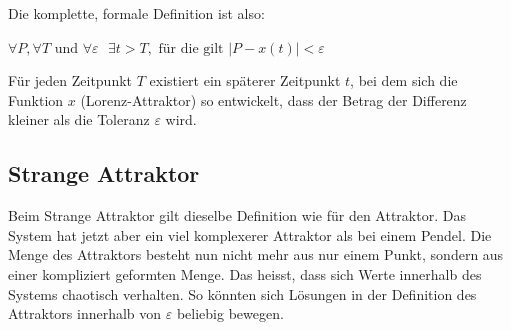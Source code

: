 Die komplette, formale Definition ist also:

\begin{center}\label{Attraktor}
$\forall P, \forall T \text{ und } \forall \varepsilon \text{ } \exists t > T , \text{ für die gilt } |P - x(t) |< \varepsilon$
\end{center}

Für jeden Zeitpunkt $T$ existiert ein späterer Zeitpunkt $t$, bei dem sich die Funktion $x$ (Lorenz-Attraktor) so entwickelt, dass der Betrag der Differenz kleiner als die Toleranz $\varepsilon$ wird. 


\subsection{Strange Attraktor}
Beim Strange Attraktor gilt dieselbe Definition wie für den Attraktor. Das System hat jetzt aber ein viel komplexerer Attraktor als bei einem Pendel. Die Menge des Attraktors besteht nun nicht mehr aus nur einem Punkt, sondern aus einer kompliziert geformten Menge. Das heisst, dass sich Werte innerhalb des Systems chaotisch verhalten. So könnten sich Lösungen in der Definition des Attraktors innerhalb von $\varepsilon$ beliebig bewegen. 